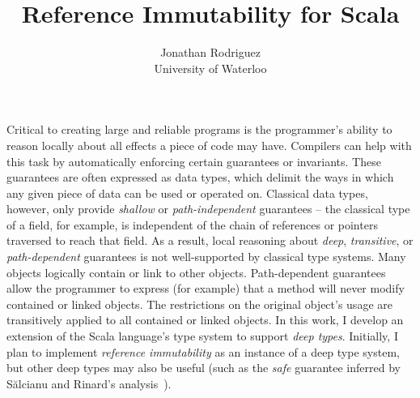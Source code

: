 \documentclass[letterpaper,11pt]{article}
\theoremstyle{definition}
\theoremstyle{remark}
\begin{document}
	

\title{Reference Immutability for Scala}
\author{Jonathan Rodriguez\\University of Waterloo}
\maketitle





Critical to creating large and reliable programs
is the programmer's ability to reason locally about
all effects a piece of code may have.
Compilers can help with this task by automatically enforcing
certain guarantees or invariants.
These guarantees are often expressed as data types, which delimit the
ways in which any given piece of data can be used or operated on.
Classical data types, however, only provide \emph{shallow} or \emph{path-independent} guarantees --
the classical type of a field, for example, is independent of
the chain of references or pointers traversed
to reach that field.
As a result, local reasoning about \emph{deep}, \emph{transitive}, or \emph{path-dependent}
guarantees is not well-supported by classical type systems.
Many objects logically contain or link to other objects.
Path-dependent guarantees allow the programmer to express (for example) that a method
will never modify contained or linked objects.
The restrictions on the original object's usage are transitively applied to all contained or linked objects.
In this work, I
develop an extension of the Scala language's type system to support
\emph{deep types}.
Initially, I plan to implement \emph{reference immutability} as an instance of a deep type system,
but other deep types may also be useful (such as the \emph{safe} guarantee
inferred by Sălcianu and Rinard's analysis~\cite{purity-effect-java}).
\end{document}
